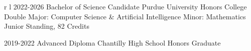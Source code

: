\documentclass[
	10pt, %
]{FreemanCV}
\begin{document}
\begin{paracol}{2}
\begin{supertabular}{r l}
	\qualificationentry
		{2022-2026} %
		{Bachelor of Science Candidate} %
		{Purdue University Honors College} %
		{Double Major: Computer Science \& Artificial Intelligence} %
		{Minor: Mathematics}
		{Junior Standing, 82 Credits} %


	\qualificationentry
		{2019-2022} %
		{Advanced Diploma} %
		{Chantilly High School} %
		{} %
		{}
		{Honors Graduate} %


\end{supertabular}












\end{paracol}
\end{document}
